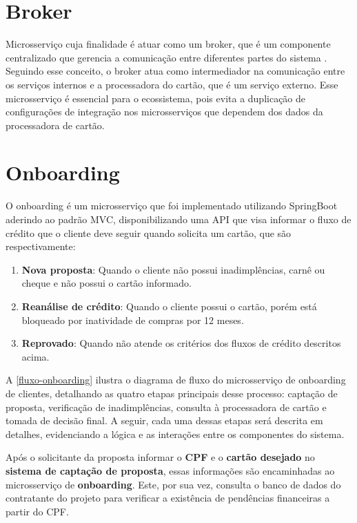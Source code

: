 \section{Broker}

Microsserviço cuja finalidade é atuar como um broker, que é um  
componente centralizado que gerencia a comunicação entre diferentes partes do sistema \cite{distributed:systems:book}. 
Seguindo esse conceito, o broker atua como intermediador na comunicação entre os 
serviços internos e a processadora do cartão, que é um serviço externo. 
Esse microsserviço é essencial para o ecossistema, pois evita a duplicação de 
configurações de integração nos microsserviços que dependem dos dados da processadora 
de cartão.

\section{Onboarding}

O onboarding é um microsserviço que foi implementado utilizando SpringBoot aderindo ao padrão MVC, disponibilizando 
uma API que visa informar o fluxo de crédito que o cliente deve seguir quando solicita um cartão, 
que são respectivamente: 
\begin{enumerate} 
    \item \textbf{Nova proposta}: Quando o cliente não possui inadimplências, carnê ou cheque e não possui o cartão 
    informado. 					
    \item \textbf{Reanálise de crédito}: Quando o cliente possui o cartão, porém está bloqueado por inatividade de 
    compras por 12 meses.
    \item \textbf{Reprovado}: Quando não atende os critérios dos fluxos de crédito descritos acima.
\end{enumerate}

A \autoref{fluxo-onboarding} ilustra o diagrama de fluxo do microsserviço de onboarding de clientes, detalhando as 
quatro etapas principais desse processo: captação de proposta, verificação de 
inadimplências, consulta à processadora de cartão e tomada de decisão final. 
A seguir, cada uma dessas etapas será descrita em detalhes, evidenciando a lógica e as interações entre os componentes do sistema.

Após o solicitante da proposta informar o \textbf{CPF} e o \textbf{cartão desejado} no 
\textbf{sistema de captação de proposta}, essas informações são
encaminhadas ao microsserviço de \textbf{onboarding}. Este, por sua vez, 
consulta o banco de dados do contratante  do projeto para verificar a existência de 
pendências financeiras a partir do CPF. 

